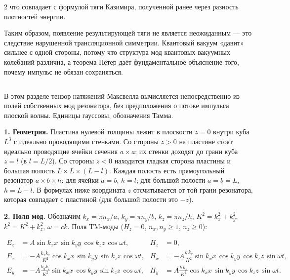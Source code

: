 \documentclass[twoside, 10pt]{article}
\def\myvspacebeforesubsection{-2.0mm}
\def\myvspaceaftersubsection{-2.5mm}
\begin{document}
\begin{multicols}{2}
что совпадает с формулой тяги Казимира, полученной ранее через разность плотностей энергии.

Таким образом, появление результирующей тяги не является неожиданным — это следствие нарушенной трансляционной симметрии.
Квантовый вакуум «давит» сильнее с одной стороны, потому что структура мод квантовых вакуумных колебаний различна,
а теорема Нётер даёт фундаментальное объяснение того, почему импульс не обязан сохраняться.



\vspace{\myvspacebeforesubsection}
\subsection*{}
\vspace{\myvspaceaftersubsection}

В этом разделе тензор натяжений Максвелла вычисляется непосредственно из полей
собственных мод резонатора, без предположения о потоке импульса плоской волны.
Единицы гауссовы, обозначения Тамма.

\textbf{1. Геометрия.} Пластина нулевой толщины лежит в плоскости $z=0$ внутри куба
$L^3$ с идеально проводящими стенками. Со стороны $z>0$ на пластине стоят идеально
проводящие ячейки сечения $a\times a$; их стенки доходят до грани куба $z=l$
(в \cite{Drozdov2024} $l=L/2$). Со стороны $z<0$ находится гладкая сторона пластины и
большая полость $L\times L\times(L-l)$. Каждая полость есть прямоугольный резонатор
$a\times b\times h$: для ячейки $a=b$, $h=l$; для большой полости $a=b=L$, $h=L-l$.
В формулах ниже координата $z$ отсчитывается от той грани резонатора, которая
совпадает с пластиной (для большой полости это $-z$).

\textbf{2. Поля мод.} Обозначим $k_x=\pi n_x/a$, $k_y=\pi n_y/b$, $k_z=\pi n_z/h$,
$K^2=k_x^2+k_y^2$, $k^2=K^2+k_z^2$, $\omega=ck$. Поля TM-моды ($H_z=0$,
$n_x,n_y\ge1$, $n_z\ge0$):
\end{multicols}
\[
\begin{aligned}
E_z&=A\sin k_xx\,\sin k_yy\,\cos k_zz\,\cos\omega t, &
H_z&=0,\\
E_x&=-A\frac{k_xk_z}{K^2}\cos k_xx\,\sin k_yy\,\sin k_zz\,\cos\omega t, &
H_x&=-A\frac{k\,k_y}{K^2}\sin k_xx\,\cos k_yy\,\cos k_zz\,\sin\omega t,\\
E_y&=-A\frac{k_yk_z}{K^2}\sin k_xx\,\cos k_yy\,\sin k_zz\,\cos\omega t, &
H_y&=A\frac{k\,k_x}{K^2}\cos k_xx\,\sin k_yy\,\cos k_zz\,\sin\omega t.
\end{aligned}
\]
\end{document}
